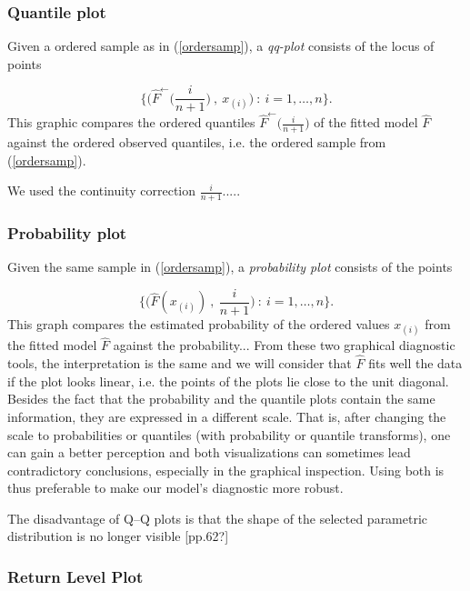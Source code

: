 \documentclass[11pt,a4paper,openany ]{book}
\begin{document}
\subsubsection*{Quantile plot} Given a ordered sample as in (\ref{ordersamp}), a \emph{qq-plot} consists of the locus of points 

\begin{equation}
\Bigg\{\bigg(\hat{F}^{\leftarrow}\Big(\frac{i}{n+1}\Big)\ ,\ x_{(i)}\bigg) \ : \ i=1,\dots,n\Bigg\}.
\end{equation}
This graphic compares the ordered quantiles $\hat{F}^{\leftarrow}\Big(\frac{i}{n+1}\Big)$ of the fitted model $\hat{F}$ against the ordered observed quantiles, i.e. the ordered sample from (\ref{ordersamp}).

We used the continuity correction $\frac{i}{n+1}$.....


\subsubsection*{Probability plot} Given the same sample in (\ref{ordersamp}), a \emph{probability plot} consists of the points 

\begin{equation}
\Bigg\{\bigg(\hat{F}(x_{(i)})\ ,\ \frac{i}{n+1}\bigg) \ : \ i=1,\dots,n\Bigg\}.
\end{equation}
This graph compares the estimated probability of the ordered values $x_{(i)}$ from the fitted model $\hat{F}$ against the probability...
\newline
From these two graphical diagnostic tools, the interpretation is the same and we will consider that $\hat{F}$ fits well the data if the plot looks linear, i.e. the points of the plots lie close to the unit diagonal.
\newline
Besides the fact that the probability and the quantile plots contain the same information, they are expressed in a different scale. That is, after changing the scale to probabilities or quantiles (with probability or quantile transforms), one can gain a better perception and both visualizations can sometimes lead contradictory conclusions, especially in the graphical inspection. Using both is thus preferable to make our model's diagnostic more robust.

The disadvantage of Q–Q plots is that the shape of the selected
parametric distribution is no longer visible \cite{beirlant_statistics_2006}[pp.62?]


\subsubsection*{Return Level Plot}
\end{document}
